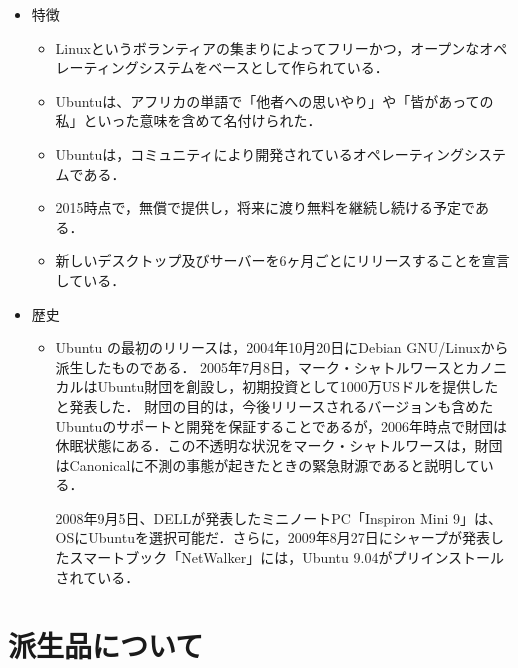 \begin{itemize}

 \item	特徴

\begin{itemize}
\setlength{\parskip}{3mm}


 \item	Linuxというボランティアの集まりによってフリーかつ，オープンなオペレーティングシステムをベースとして作られている．

 \item	Ubuntuは、アフリカの単語で「他者への思いやり」や「皆があっての私」といった意味を含めて名付けられた．

 \item	Ubuntuは，コミュニティにより開発されているオペレーティングシステムである．

 \item	2015時点で，無償で提供し，将来に渡り無料を継続し続ける予定である．

 \item	新しいデスクトップ及びサーバーを6ヶ月ごとにリリースすることを宣言している．


\end{itemize}

 \item	歴史

\begin{itemize}
\setlength{\parskip}{3mm}

 \item	Ubuntu の最初のリリースは，2004年10月20日にDebian GNU/Linuxから派生したものである．
2005年7月8日，マーク・シャトルワースとカノニカルはUbuntu財団を創設し，初期投資として1000万USドルを提供したと発表した．
財団の目的は，今後リリースされるバージョンも含めたUbuntuのサポートと開発を保証することであるが，2006年時点で財団は休眠状態にある．この不透明な状況をマーク・シャトルワースは，財団はCanonicalに不測の事態が起きたときの緊急財源であると説明している．

2008年9月5日、DELLが発表したミニノートPC「Inspiron Mini 9」は、OSにUbuntuを選択可能だ．さらに，2009年8月27日にシャープが発表したスマートブック「NetWalker」には，Ubuntu 9.04がプリインストールされている．\cite{Ubuntu}

\end{itemize}
\end{itemize}



\section{派生品について}


